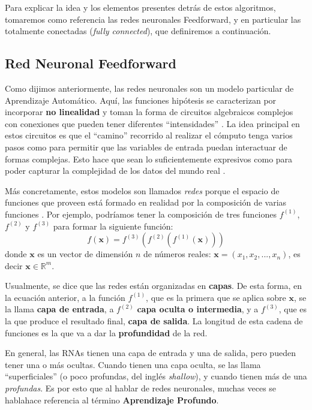 \documentclass[../../main.tex]{subfiles}
\begin{document}
Para explicar la idea y los elementos presentes detrás de estos algoritmos, tomaremos como
referencia las redes neuronales Feedforward, y en particular las totalmente conectadas
(\textit{fully connected}), que definiremos a continuación.


\subsection{Red Neuronal Feedforward}
Como dijimos anteriormente, las redes neuronales son un modelo particular de Aprendizaje
Automático. Aquí, las funciones hipótesis se caracterizan por incorporar \textbf{no
linealidad} y toman la forma de circuitos algebraicos complejos con conexiones que pueden
tener diferentes ``intensidades'' \cite{ai-a-modern-approach}. La idea principal en estos
circuitos es que el ``camino'' recorrido al realizar el cómputo tenga varios pasos como
para permitir que las variables de entrada puedan interactuar de formas complejas. Esto
hace que sean lo suficientemente expresivos como para poder capturar la complejidad de los
datos del mundo real \cite{ai-a-modern-approach}.

Más concretamente, estos modelos son llamados \textit{redes} porque el espacio de
funciones que proveen está formado en realidad por la composición de varias funciones
\cite{deep-learning}. Por ejemplo, podríamos tener la composición de tres funciones
\(f^{(1)}\), \(f^{(2)}\) y \(f^{(3)}\) para formar la siguiente función:
\begin{equation}
    f(\mathbf{x}) = f^{(3)}(f^{(2)}(f^{(1)}(\mathbf{x})))
    \label{eq:fun-composition}
\end{equation}
donde \(\mathbf{x}\) es un vector de dimensión \(n\) de números reales: \(\mathbf{x}=(x_1,
x_2, ..., x_n)\), es decir \(\mathbf{x} \in \mathbb{R}^m\).

Usualmente, se dice que las redes están organizadas en \textbf{capas}. De esta forma, en
la ecuación anterior, a la función \(f^{(1)}\), que es la primera que se aplica sobre
\(\mathbf{x}\), se la llama \textbf{capa de entrada}, a \(f^{(2)}\) \textbf{capa oculta o
intermedia}, y a \(f^{(3)}\), que es la que produce el resultado final, \textbf{capa de
salida}. La longitud de esta cadena de funciones es la que va a dar la
\textbf{profundidad} de la red.

En general, las RNAs tienen una capa de entrada y una de salida, pero pueden tener una o
más ocultas. Cuando tienen una capa oculta, se las llama ``superficiales'' (o poco
profundas, del inglés \textit{shallow}), y cuando tienen más de una \textit{profundas}. Es
por esto que al hablar de redes neuronales, muchas veces se hablahace referencia al
término \textbf{Aprendizaje Profundo}.
\end{document}
